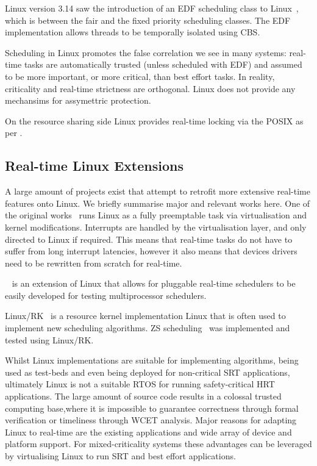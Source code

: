 Linux version 3.14 saw the introduction of an \gls{EDF} scheduling class to Linux~\citep{Corbet_2009}, which is between the fair and the fixed priority scheduling classes.
The \gls{EDF} implementation allows threads to be temporally isolated using \gls{CBS}.

Scheduling in Linux promotes the false correlation we see in many systems: real-time tasks are automatically trusted (unless scheduled with \gls{EDF}) and assumed to be more important, or more critical, than best effort tasks.
In reality, criticality and real-time strictness are orthogonal.
Linux does not provide any mechansims for assymettric protection.

On the resource sharing side Linux provides real-time locking via the POSIX  as per .
 
\subsection{Real-time Linux Extensions}

A large amount of projects exist that attempt to retrofit more extensive real-time features onto Linux.
We briefly summarise major and relevant works here. 
One of the original works~\citep{Yodaiken_Barabanov_97} runs Linux as a fully preemptable task via virtualisation and kernel modifications.
Interrupts are handled by the virtualisation layer, and only directed to Linux if required.
This means that real-time tasks do not have to suffer from long interrupt latencies, however it also means that devices drivers need to be rewritten from scratch for real-time.

\litmus~\citep{Calandrino_LBDA_2007} is an extension of Linux that allows for pluggable real-time schedulers to be easily developed for testing multiprocessor schedulers.

Linux/RK~\citep{Oikawa_Rajkumar_1998} is a resource kernel implementation Linux that is often used to implement new scheduling algorithms.
\gls{ZS} scheduling~\citep{deNiz_LR_2009} was implemented and tested using Linux/RK.

Whilst Linux implementations are suitable for implementing algorithms, being used as test-beds and even being deployed for non-critical \gls{SRT} applications, ultimately Linux is not a suitable \gls{RTOS} for running safety-critical \gls{HRT} applications. The large amount of source code results in a colossal trusted computing base,where it is impossible to guarantee correctness through formal verification or timeliness through {\gls{WCET}} analysis.  Major reasons for adapting Linux to real-time are the existing applications and wide array of device and platform support. For mixed-criticality systems these advantages can be leveraged by virtualising Linux to run \gls{SRT} and best effort applications.

